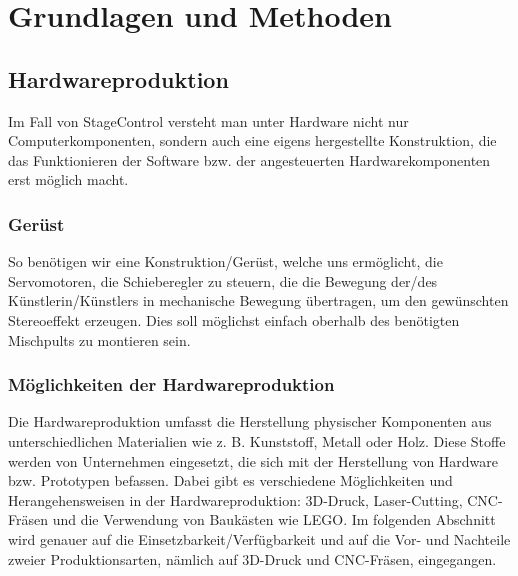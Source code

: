 
\pagestyle{fancy} \frenchspacing
\renewcommand{\chaptermark}[1]{\markboth{#1}{}}

\renewcommand{\textfraction}{0}
\renewcommand{\floatpagefraction}{0.999}
\renewcommand{\topfraction}{0.7}
\renewcommand{\bottomfraction}{0.999}
\lfoot{}


\fancyhf{} %





\chapter{Grundlagen und Methoden}

\section{Hardwareproduktion} \label{Hardwareproduktion}
Im Fall von StageControl versteht man unter Hardware nicht nur Computerkomponenten, sondern auch eine eigens hergestellte Konstruktion, die das Funktionieren der Software bzw. der angesteuerten Hardwarekomponenten erst möglich macht.

\subsection{Gerüst}
So benötigen wir eine Konstruktion/Gerüst, welche uns ermöglicht, die Servomotoren, die Schieberegler zu steuern, die die Bewegung der/des Künstlerin/Künstlers in mechanische Bewegung übertragen, um den gewünschten Stereoeffekt erzeugen. Dies soll möglichst einfach oberhalb des benötigten Mischpults zu montieren sein.


\subsection{Möglichkeiten der Hardwareproduktion}
Die Hardwareproduktion umfasst die Herstellung physischer Komponenten aus unterschiedlichen Materialien wie z. B. Kunststoff, Metall oder Holz. Diese Stoffe werden von Unternehmen eingesetzt, die sich mit der Herstellung von Hardware bzw. Prototypen befassen. Dabei gibt es verschiedene Möglichkeiten und Herangehensweisen in der Hardwareproduktion: 3D-Druck, Laser-Cutting, CNC-Fräsen und die Verwendung von Baukästen wie LEGO. Im folgenden Abschnitt wird genauer auf die Einsetzbarkeit/Verfügbarkeit und auf die Vor- und Nachteile zweier Produktionsarten, nämlich auf 3D-Druck und CNC-Fräsen, eingegangen.

